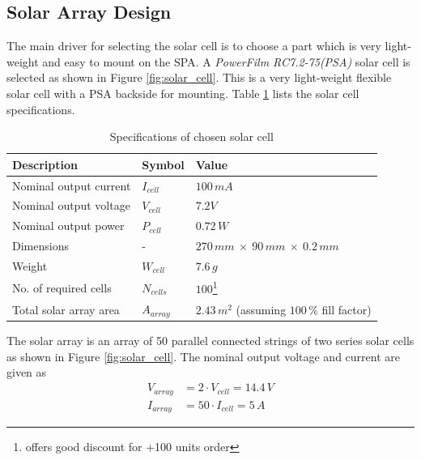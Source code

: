 \subsection{Solar Array Design}
\label{sec:SA}
The main driver for selecting the solar cell is to choose a part which is very light-weight and easy to mount on the \ac{SPA}. A  \textit{PowerFilm RC7.2-75(PSA)} solar cell is selected as shown in Figure \ref{fig:solar_cell}. This is a very light-weight flexible solar cell with a \ac{PSA} backside for mounting. Table \ref{tab:solar_cell_spec} lists the solar cell specifications.
%
\begin{table}[H]
\centering
\caption{Specifications of chosen solar cell}
\label{tab:solar_cell_spec}
\begin{minipage}{\textwidth}
\begin{tabular}{p{}p{}p{}}
\hline
\textbf{Description} & \textbf{Symbol} & \textbf{Value}\\
\hline
Nominal output current & $I_{cell}$ & $100\,mA$\\
Nominal output voltage & $V_{cell}$ & $7.2V$\\
Nominal output power & $P_{cell}$ & $0.72\,W$\\
Dimensions & - & $270\,mm\:\times\:90\,mm\:\times\:0.2\,mm$\\
Weight & $W_{cell}$ & $7.6\,g$\\
No. of required cells & $N_{cells}$ & $100$\footnote{\cite{avnetexpress} offers good discount for +100 units order}\\
Total solar array area & $A_{array}$ & $2.43\,m^2$ (assuming $100\,\%$ fill factor)\\
\hline
\end{tabular}\par
\vspace{-0.75\skip\footins}
\renewcommand{\footnoterule}{}
\end{minipage}
\end{table}
%
\noindent
The solar array is an array of 50 parallel connected strings of two series solar cells as shown in Figure \ref{fig:solar_cell}. The nominal output voltage and current are given as
%
\begin{equation}
\begin{split}
V_{array}&=2\cdot V_{cell}=14.4\,V\\
I_{array}&=50\cdot I_{cell}=5\,A
\end{split}
\end{equation}
%
